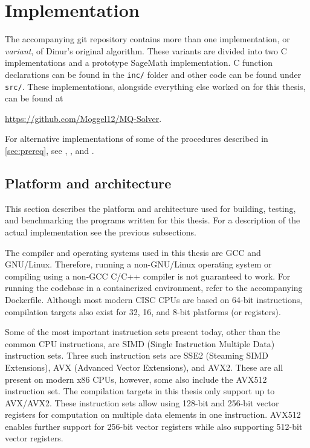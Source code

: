 \section{Implementation} \label{sec:impl}
The accompanying git repository contains more than one implementation, or \textit{variant}, of Dinur's original algorithm. These variants are divided into two C implementations and a prototype SageMath implementation. C function declarations can be found in the \texttt{inc/} folder and other code can be found under \texttt{src/}. These implementations, alongside everything else worked on for this thesis, can be found at 
\begin{center}
    \url{https://github.com/Moggel12/MQ-Solver}.
\end{center}

For alternative implementations of some of the procedures described in \cref{sec:prereq}, see \cite{ches-2010-23990}, \cite{cryptoeprint:2013/436}, and \cite{crypto-2022-32130}.

\subsection{Platform and architecture}

This section describes the platform and architecture used for building, testing, and benchmarking the programs written for this thesis. For a description of the actual implementation see the previous subsections.

The compiler and operating systems used in this thesis are GCC and GNU/Linux. Therefore, running a non-GNU/Linux operating system or compiling using a non-GCC C/C++ compiler is not guaranteed to work. For running the codebase in a containerized environment, refer to the accompanying Dockerfile. Although most modern CISC CPUs are based on 64-bit instructions, compilation targets also exist for 32, 16, and 8-bit platforms (or registers).

Some of the most important instruction sets present today, other than the common CPU instructions, are SIMD (Single Instruction Multiple Data) instruction sets. Three such instruction sets are SSE2 (Steaming SIMD Extensions), AVX (Advanced Vector Extensions), and AVX2. These are all present on modern x86 CPUs, however, some also include the AVX512 instruction set. The compilation targets in this thesis only support up to AVX/AVX2. These instruction sets allow using 128-bit and 256-bit vector registers for computation on multiple data elements in one instruction. AVX512 enables further support for 256-bit vector registers while also supporting 512-bit vector registers.

